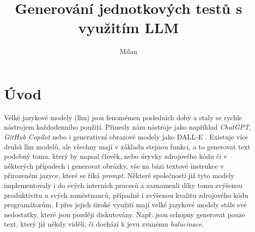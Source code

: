 \documentclass[czech, ma, kiv, he, iso690numb, pdf, viewonly]{fasthesis}
\title{Generování jednotkových testů s využitím LLM}
\author{Milan}{Horínek}{Bc.}{}
\begin{document}
\frontpages[tm] %
\tableofcontents
% 
%
\makeatletter%
\ifx\FASThesis@style\c@fullcolor%
\else%
\fi%
\makeatother%

\setlength{\parskip}{1em}


\chapter{Úvod}

    Velké jazykové modely (\Gls{llm}) jsou fenomémen posledních doby a staly se rychle nástrojem každodenního použití. Přinesly nám nástroje jako například \textit{ChatGPT, GitHub Copilot} nebo i generativní obrazové modely jako DALL-E \cite{ramesh2022hierarchical}. Existuje více druhů \Gls{llm} modelů, ale všechny mají v základu stejnou funkci, a to generovat text podobný tomu, který by napsal člověk, nebo úryvky zdrojového kódu či v některých případech i generovat obrázky, vše na bázi textové instrukce v přirozeném jazyce, které se říká \textit{prompt}. Některé společnosti již tyto modely implementovaly i do svých interních procesů a zaznamenli díky tomu zvýšenou produktivitu u svých zaměstnanců, případně i zvýšenou kvalitu zdrojového kódu programátorům. \cite{chatterjee2024impact} I přes jejich široké využití mají velké jazykové modely stále své nedostatky, které jsou později diskutovány. Např. jsou schopny generovat pouze text, který již někdy viděli, či dochází k jevu zvanému \textit{halucinace}. 
\end{document}
